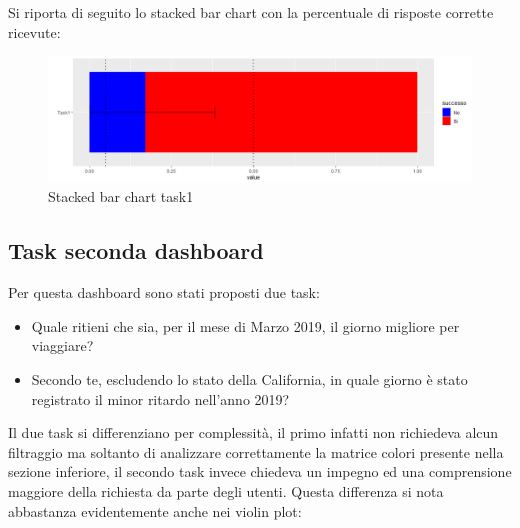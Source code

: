 \documentclass[12pt]{article}
\begin{document}
Si riporta di seguito lo stacked bar chart con la percentuale di risposte corrette ricevute:
\begin{figure}[H]
    \centering
    \includegraphics[scale = 0.45]{img/task/Dash1_task_ErrorBar.png}
    \caption{Stacked bar chart task1}
\end{figure}


\subsection{Task seconda dashboard}
Per questa dashboard sono stati proposti due task:
\begin{itemize}
    \item Quale ritieni che sia, per il mese di Marzo 2019, il giorno migliore per viaggiare?
    \item Secondo te, escludendo lo stato della California, in quale giorno è stato registrato il minor ritardo nell'anno 2019?
\end{itemize}
Il due task si differenziano per complessità, il primo infatti non richiedeva alcun filtraggio ma soltanto di analizzare correttamente la matrice colori presente nella sezione inferiore, il secondo task invece chiedeva un impegno ed una comprensione maggiore della richiesta da parte degli utenti. Questa differenza si nota abbastanza evidentemente anche nei violin plot:  
\end{document}
